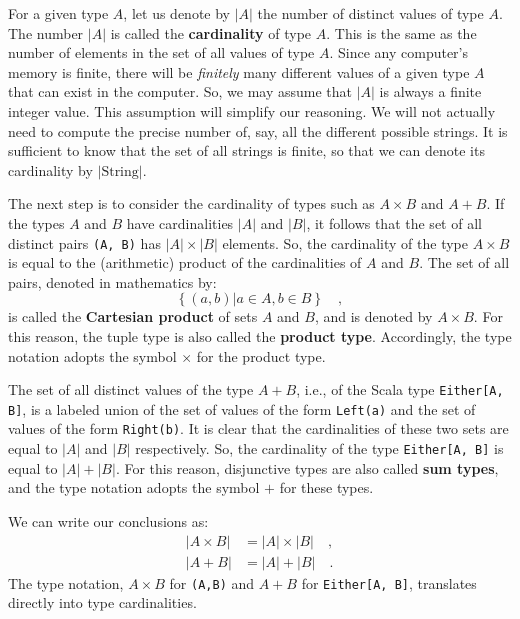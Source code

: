 For a given type $A$, let us denote by $\left|A\right|$ the number
of distinct values of type $A$. The number $\left|A\right|$ is called
the \textbf{cardinality} of type $A$. This is
the same as the number of elements in the set of all values of type
$A$. Since any computer\textsf{'}s memory is finite, there will be \emph{finitely}
many different values of a given type $A$ that can exist in the computer.
So, we may assume that $\left|A\right|$ is always a finite integer
value. This assumption will simplify our reasoning. We will not actually
need to compute the precise number of, say, all the different possible
strings. It is sufficient to know that the set of all strings is finite,
so that we can denote its cardinality by $|\text{String}|$.

The next step is to consider the cardinality of types such as $A\times B$
and $A+B$. If the types $A$ and $B$ have cardinalities $\left|A\right|$
and $\left|B\right|$, it follows that the set of all distinct pairs
\lstinline!(A, B)! has $\left|A\right|\times\left|B\right|$ elements.
So, the cardinality of the type $A\times B$ is equal to the (arithmetic)
product of the cardinalities of $A$ and $B$. The set of all pairs,
denoted in mathematics by:
\[
\left\{ (a,b)|a\in A,b\in B\right\} \quad,
\]
is called the \textbf{Cartesian product}
of sets $A$ and $B$, and is denoted by $A\times B$. For this reason,
the tuple type is also called the \textbf{product
type}. Accordingly, the type notation adopts the symbol $\times$
for the product type.

The set of all distinct values of the type $A+B$, i.e., of the Scala
type \lstinline!Either[A, B]!, is a labeled
union of the set of values of the form \lstinline!Left(a)! and the
set of values of the form \lstinline!Right(b)!. It is clear that
the cardinalities of these two sets are equal to $\left|A\right|$
and $\left|B\right|$ respectively. So, the cardinality of the type
\lstinline!Either[A, B]! is equal to $\left|A\right|+\left|B\right|$.
For this reason, disjunctive types are also called \textbf{sum
types}, and the type notation adopts the symbol $+$ for these types.

We can write our conclusions as:
\begin{align*}
\left|A\times B\right| & =\left|A\right|\times\left|B\right|\quad,\\
\left|A+B\right| & =\left|A\right|+\left|B\right|\quad.
\end{align*}
The type notation, $A\times B$ for \lstinline!(A,B)! and $A+B$
for \lstinline!Either[A, B]!, translates directly into type cardinalities.

